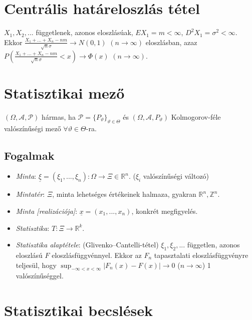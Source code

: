 \documentclass[margin=0px]{article}
\begin{document}
	\section{Centrális határeloszlás tétel}
	
	$X_1, X_2, ...$ függetlenek, azonos eloszlásúak, $EX_1 = m < \infty$, $D^{2}X_1 = \sigma^2 < \infty$. \\
	Ekkor $\frac{X_1 + ... + X_n - nm}{\sqrt{n}\sigma} \rightarrow N(0,1)$ $(n \to \infty)$ eloszlásban, azaz $P(\frac{X_1 + ... + X_n - nm}{\sqrt{n}\sigma} < x) \rightarrow \Phi(x)$ $(n \to \infty)$.
	
	\section{Statisztikai mező}
	
	$(\Omega, \mathcal{A}, \mathcal{P})$ hármas, ha $\mathcal{P} = \{P_{\vartheta}\}_{\vartheta \in \Theta}$ és $(\Omega, \mathcal{A}, P_{\vartheta})$ Kolmogorov-féle valószínűségi mező $\forall \vartheta \in \Theta$-ra.
	
	\subsection{Fogalmak}
	
	\begin{itemize}
		\item \textit{Minta}: $\underline{\xi} = (\xi_1,...,\xi_n): \Omega \to \Xi \in \mathbb{R}^n$. ($\xi_i$ valószínűségi változó)
		\item \textit{Mintatér}: $\Xi$, minta lehetséges értékeinek halmaza, gyakran $\mathbb{R}^n, \mathbb{Z}^n$.
		\item \textit{Minta [realizációja]}: $\underline{x} = (x_1,...,x_n)$, konkrét megfigyelés.
		\item \textit{Statisztika}: $T: \Xi \to \mathbb{R}^k$.
		\item \textit{Statisztika alaptétele}: (Glivenko--Cantelli-tétel) $\xi_1, \xi_2, ...$ független, azonos eloszlású $F$ eloszlásfüggvénnyel. Ekkor az $F_n$ tapasztalati eloszlásfüggvényre teljesül, hogy $\sup_{-\infty<x<\infty}{|F_n(x) - F(x)|} \to 0$ ($n \to \infty$) 1 valószínűséggel.
	\end{itemize}
	
	\section{Statisztikai becslések}
	
\end{document}
